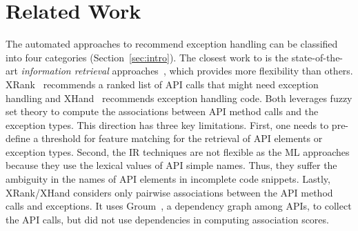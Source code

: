 \section{Related Work}
\label{sec:related}

The automated approaches to recommend exception handling can be
classified into four categories (Section~\ref{sec:intro}).
The closest work to {\tool} is the state-of-the-art {\em information
  retrieval} approaches~\cite{xrank-fse20}, which provides more
flexibility than others. XRank~\cite{xrank-fse20} recommends a
ranked list of API calls that might need exception handling and
XHand~\cite{xrank-fse20} recommends exception handling code. Both
leverages fuzzy set theory to compute the associations between API
method calls and the exception types. This direction has three key
limitations. First, one needs to pre-define a threshold for feature
matching for the retrieval of API elements or exception types. Second,
the IR techniques are not flexible as the ML approaches because they
use the lexical values of API simple names. Thus, they suffer the
ambiguity in the names of API elements in incomplete code
snippets. Lastly, XRank/XHand considers only pairwise associations
between the API method calls and exceptions.
It uses Groum~\cite{fse09}, a dependency graph among
APIs, to collect the API calls, but did not use dependencies
in computing association scores.

